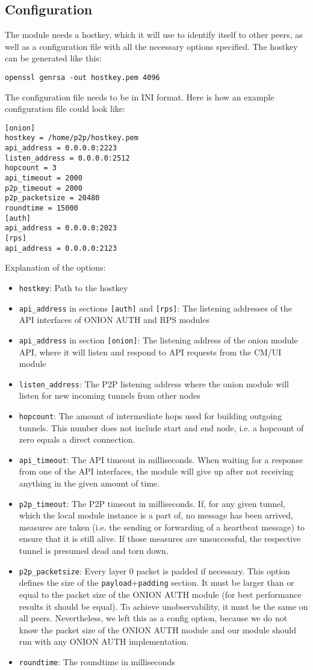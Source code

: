 \documentclass{article}
\begin{document}
\subsection{Configuration}
The module needs a hostkey, which it will use to identify itself to other peers, as well as a configuration file with all the necessary options specified. The hostkey can be generated like this:
\begin{lstlisting}
openssl genrsa -out hostkey.pem 4096
\end{lstlisting} 
The configuration file needs to be in INI format. Here is how an example configuration file could look like:
\begin{lstlisting}
[onion]
hostkey = /home/p2p/hostkey.pem
api_address = 0.0.0.0:2223
listen_address = 0.0.0.0:2512
hopcount = 3
api_timeout = 2000
p2p_timeout = 2000
p2p_packetsize = 20480
roundtime = 15000
[auth]
api_address = 0.0.0.0:2023
[rps]
api_address = 0.0.0.0:2123
\end{lstlisting}
Explanation of the options:
\begin{itemize}
\item \texttt{hostkey}: Path to the hostkey
\item \texttt{api\_address} in sections \texttt{[auth]} and \texttt{[rps]}: The listening addresses of the API interfaces of ONION AUTH and RPS modules
\item \texttt{api\_address} in section \texttt{[onion]}: The listening address of the onion module API, where it will listen and respond to API requests from the CM/UI module
\item \texttt{listen\_address}: The P2P listening address where the onion module will listen for new incoming tunnels from other nodes
\item \texttt{hopcount}: The amount of intermediate hops used for building outgoing tunnels. This number does not include start and end node, i.e. a hopcount of zero equals a direct connection.
\item \texttt{api\_timeout}: The API timeout in milliseconds. When waiting for a response from one of the API interfaces, the module will give up after not receiving anything in the given amount of time.
\item \texttt{p2p\_timeout}: The P2P timeout in milliseconds. If, for any given tunnel, which the local module instance is a part of, no message has been arrived, measures are taken (i.e. the sending or forwarding of a heartbeat message) to ensure that it is still alive. If those measures are unsuccessful, the respective tunnel is presumed dead and torn down.
\item \texttt{p2p\_packetsize}: Every layer 0 packet is padded if necessary. This option defines the size of the \texttt{payload}+\texttt{padding} section. It must be larger than or equal to the packet size of the ONION AUTH module (for best performance results it should be equal). To achieve unobservability, it must be the same on all peers. Nevertheless, we left this as a config option, because we do not know the packet size of the ONION AUTH module and our module should run with any ONION AUTH implementation.
\item \texttt{roundtime}: The roundtime in milliseconds
\end{itemize}
\end{document}
